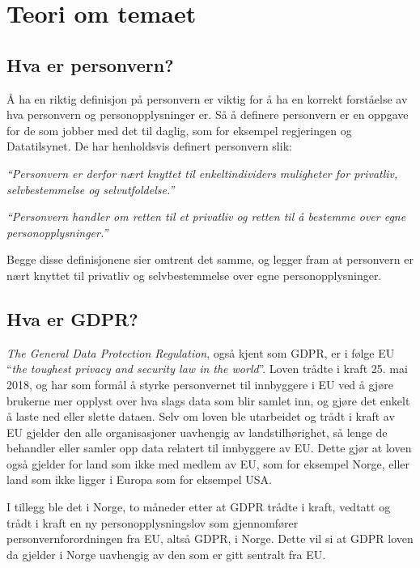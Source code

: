 \section{Teori om temaet}

\subsection{Hva er personvern?}
Å ha en riktig definisjon på personvern er viktig for å ha en korrekt forståelse av hva personvern og personopplysninger er. Så å definere personvern er en oppgave for de som jobber med det til daglig, som for eksempel regjeringen og Datatilsynet. De har henholdsvis definert personvern slik:

\textit{``Personvern er derfor nært knyttet til enkeltindividers muligheter for privatliv, selvbestemmelse og selvutfoldelse.''} \parencite{artikkel:regjeringen_personvern}

\textit{``Personvern handler om retten til et privatliv og retten til å bestemme over egne personopplysninger.''} \parencite{artikkel:datatilsynet_personvern}

Begge disse definisjonene sier omtrent det samme, og legger fram at personvern er nært knyttet til privatliv og selvbestemmelse over egne personopplysninger.

\subsection{Hva er GDPR?}
\textit{The General Data Protection Regulation}, også kjent som GDPR, er i følge EU ``\emph{the toughest privacy and security law in the world}''. Loven trådte i kraft 25. mai 2018, og har som formål å styrke personvernet til innbyggere i EU ved å gjøre brukerne mer opplyst over hva slags data som blir samlet inn, og gjøre det enkelt å laste ned eller slette dataen. Selv om loven ble utarbeidet og trådt i kraft av EU gjelder den alle organisasjoner uavhengig av landstilhørighet, så lenge de behandler eller samler opp data relatert til innbyggere av EU. Dette gjør at loven også gjelder for land som ikke med medlem av EU, som for eksempel Norge, eller land som ikke ligger i Europa som for eksempel USA. \parencite{artikkel:eu_gdpr}

I tillegg ble det i Norge, to måneder etter at GDPR trådte i kraft, vedtatt og trådt i kraft en ny personopplysningslov som gjennomfører personvernforordningen fra EU, altså GDPR, i Norge. Dette vil si at GDPR loven da gjelder i Norge uavhengig av den som er gitt sentralt fra EU. \parencite{artikkel:regjeringen_gdpr}

